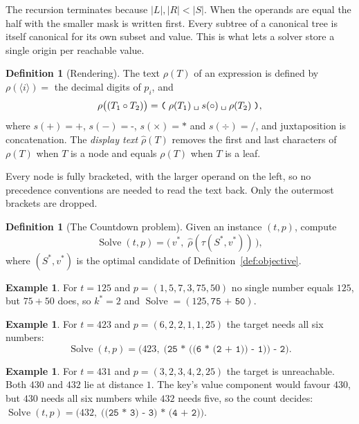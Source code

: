 \documentclass[11pt,a4paper]{article}
\theoremstyle{definition}
\newtheorem{definition}[theorem]{Definition}
\newtheorem{example}[theorem]{Example}
\theoremstyle{remark}
\newcommand{\str}[1]{\texttt{#1}}
\begin{document}
The recursion terminates because $|L|, |R| < |S|$. When the operands are equal the half with the smaller mask
is written first. Every subtree of a canonical tree is itself canonical for its own subset and value. This
is what lets a solver store a single origin per reachable value.

\begin{definition}[Rendering]
The text $\rho(T)$ of an expression is defined by
$\rho(\langle i \rangle) = $ the decimal digits of $p_i$, and
\[
\rho\bigl((T_1 \circ T_2)\bigr) = \str{(}\;\rho(T_1)\;\str{\textvisiblespace}\;s(\circ)\;\str{\textvisiblespace}\;\rho(T_2)\;\str{)},
\]
where $s(+) = \str{+}$, $s(-) = \str{-}$, $s(\times) = \str{*}$ and $s(\div) = \str{/}$, and juxtaposition is
concatenation. The \emph{display text} $\hat\rho(T)$ removes the first and last characters of $\rho(T)$ when $T$
is a node and equals $\rho(T)$ when $T$ is a leaf.
\end{definition}

Every node is fully bracketed, with the larger operand on the left, so no precedence conventions are
needed to read the text back. Only the outermost brackets are dropped.

\begin{definition}[The Countdown problem]\label{def:problem}
Given an instance $(t, p)$, compute
\[
\operatorname{Solve}(t, p) = \bigl(\, v^*,\; \hat\rho(\tau(S^*, v^*)) \,\bigr),
\]
where $(S^*, v^*)$ is the optimal candidate of Definition~\ref{def:objective}.
\end{definition}

\begin{example}
For $t = 125$ and $p = (1, 5, 7, 3, 75, 50)$ no single number equals $125$, but $75 + 50$ does, so $k^* = 2$ and
$\operatorname{Solve} = (125, \str{75 + 50})$.
\end{example}

\begin{example}
For $t = 423$ and $p = (6, 2, 2, 1, 1, 25)$ the target needs all six numbers:
\[
\operatorname{Solve}(t, p) = \bigl(423,\; \str{(25 * ((6 * (2 + 1)) - 1)) - 2}\bigr).
\]
\end{example}

\begin{example}
For $t = 431$ and $p = (3, 2, 3, 4, 2, 25)$ the target is unreachable. Both $430$ and $432$ lie at distance $1$.
The key's value component would favour $430$, but $430$ needs all six numbers while $432$ needs five, so the
count decides:
$\operatorname{Solve}(t, p) = \bigl(432,\; \str{((25 * 3) - 3) * (4 + 2)}\bigr)$.
\end{example}
\end{document}

